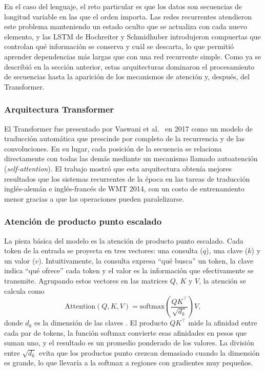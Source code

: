 En el caso del lenguaje, el reto particular es que los datos son secuencias de longitud variable en las que el orden importa. Las redes recurrentes atendieron este problema manteniendo un estado oculto que se actualiza con cada nuevo elemento, y las LSTM de Hochreiter y Schmidhuber \cite{hochreiter1997lstm} introdujeron compuertas que controlan qué información se conserva y cuál se descarta, lo que permitió aprender dependencias más largas que con una red recurrente simple. Como ya se describió en la sección anterior, estas arquitecturas dominaron el procesamiento de secuencias hasta la aparición de los mecanismos de atención y, después, del Transformer.


\subsubsection{Arquitectura Transformer}

El Transformer fue presentado por Vaswani et al.\ \cite{vaswani2017attention} en 2017 como un modelo de traducción automática que prescinde por completo de la recurrencia y de las convoluciones. En su lugar, cada posición de la secuencia se relaciona directamente con todas las demás mediante un mecanismo llamado autoatención (\textit{self-attention}). El trabajo mostró que esta arquitectura obtenía mejores resultados que los sistemas recurrentes de la época en las tareas de traducción inglés-alemán e inglés-francés de WMT 2014, con un costo de entrenamiento menor gracias a que las operaciones pueden paralelizarse.


\subsubsection{Atención de producto punto escalado}


La pieza básica del modelo es la atención de producto punto escalado. Cada token de la entrada se proyecta en tres vectores: una consulta ($q$), una clave ($k$) y un valor ($v$). Intuitivamente, la consulta expresa ``qué busca'' un token, la clave indica ``qué ofrece'' cada token y el valor es la información que efectivamente se transmite. Agrupando estos vectores en las matrices $Q$, $K$ y $V$, la atención se calcula como
\begin{equation}
\text{Attention}(Q, K, V) = \text{softmax}\left(\frac{QK^{\top}}{\sqrt{d_k}}\right)V,
\end{equation}
donde $d_k$ es la dimensión de las claves \cite{vaswani2017attention}. El producto $QK^{\top}$ mide la afinidad entre cada par de tokens, la función softmax convierte esas afinidades en pesos que suman uno, y el resultado es un promedio ponderado de los valores. La división entre $\sqrt{d_k}$ evita que los productos punto crezcan demasiado cuando la dimensión es grande, lo que llevaría a la softmax a regiones con gradientes muy pequeños.

